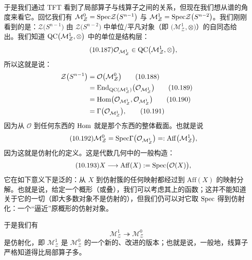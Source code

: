 于是我们通过 TFT 看到了局部算子与线算子之间的关系，但现在我们想从谱的角度来看它。回忆我们有 $\mathcal{M}_{\mathcal{Z}}^{0}=\mathrm{Spec}\mathcal{Z}\big(S^{n-1}\big)$ 与 $\mathcal{M}_{\mathcal{Z}}^{1}=\mathrm{Spec}\mathcal{Z}\big(S^{n-2}\big)$。我们刚刚看到的是：$\mathcal{Z}\big(S^{n-1}\big)$ 由 $\mathcal{Z}\big(S^{n-2}\big)$ 中单位/平凡对象（即 $\big(\mathcal{M}_{\mathcal{Z}}^{1},\otimes\big)$）的自同态给出。我们知道 $\mathrm{QC}\big(\mathcal{M}_{\mathcal{Z}}^{1},\otimes\big)$ 中的单位是结构层：
\begin{equation}\tag{10.187}
\mathcal{O}_{\mathcal{M}_{\mathcal{Z}}^{1}}\in\mathrm{QC}\big(\mathcal{M}_{\mathcal{Z}}^{1},\otimes\big),
\end{equation}
所以这就是说：
\begin{align}
\mathcal{Z}\big(S^{n-1}\big)&=\mathcal{O}\big(\mathcal{M}_{\mathcal{Z}}^{0}\big)\tag{10.188}\\
&=\mathrm{End}_{\mathrm{QC}(\mathcal{M}_{\mathcal{Z}}^{1})}\big(\mathcal{O}_{\mathcal{M}_{\mathcal{Z}}^{1}}\big)\tag{10.189}\\
&=\mathrm{Hom}\big(\mathcal{O}_{\mathcal{M}_{\mathcal{Z}}^{1}},\mathcal{O}_{\mathcal{M}_{\mathcal{Z}}^{1}}\big)\tag{10.190}\\
&=\Gamma\big(\mathcal{O}_{\mathcal{M}_{\mathcal{Z}}^{1}}\big),\tag{10.191}
\end{align}
因为从 $\mathcal{O}$ 到任何东西的 $\mathrm{Hom}$ 就是那个东西的整体截面。也就是说
\begin{equation}\tag{10.192}
\mathcal{M}_{\mathcal{Z}}^{0}=\mathrm{Spec}\Gamma\big(\mathcal{O}_{\mathcal{M}_{\mathcal{Z}}^{1}}\big)=:\mathrm{Aff}\big(\mathcal{M}_{\mathcal{Z}}^{1}\big),
\end{equation}
因为这就是仿射化的定义。这是代数几何中的一般构造：
\begin{equation}\tag{10.193}
X\longrightarrow\mathrm{Aff}(X):=\mathrm{Spec}\big(\mathcal{O}(X)\big),
\end{equation}
它在如下意义下是泛的：从 $X$ 到仿射簇的任何映射都经过到 $\mathrm{Aff}(X)$ 的映射分解。也就是说，给定一个概形（或叠），我们可以考虑其上的函数；这并不能知道关于它的一切（即大多数对象不是仿射的），但我们仍可以对它取 $\mathrm{Spec}$ 得到仿射化：一个“逼近”原概形的仿射对象。

于是我们有
\begin{equation}\tag{10.194}
\mathcal{M}_{\mathcal{Z}}^{1}\twoheadrightarrow\mathcal{M}_{\mathcal{Z}}^{0}
\end{equation}
是仿射化，即 $\mathcal{M}_{\mathcal{Z}}^{1}$ 是 $\mathcal{M}_{\mathcal{Z}}^{0}$ 的一个新的、改进的版本；也就是说，一般地，线算子严格知道得比局部算子多。

